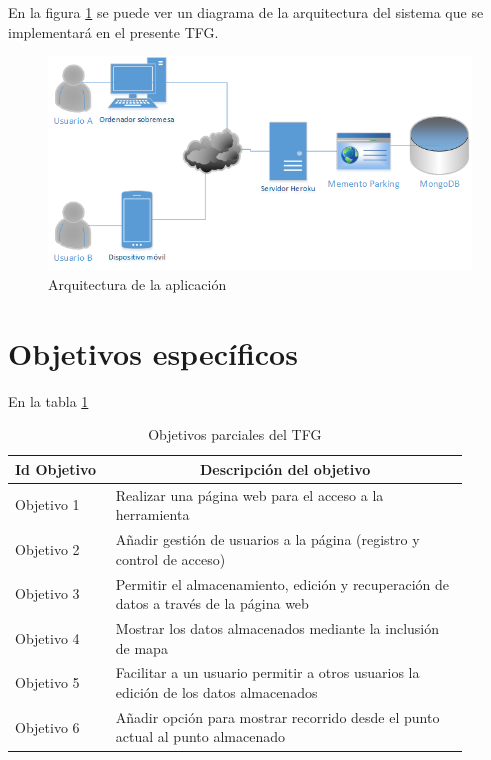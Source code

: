 
En la figura \ref{fig:arquitectura} se puede ver un diagrama de la arquitectura del sistema que se implementará en el presente TFG.
\begin{figure}[hbtp]
\centering
\includegraphics[scale=0.75, fbox={\fboxrule} 4mm]{images/objetivos/arquitectura.png}
\caption{Arquitectura de la aplicación}
\label{fig:arquitectura}
\end{figure}


\section{Objetivos específicos}

En la tabla \ref{tab:objetivos}

\begin{table}[hp]
  \centering 
  \begin{tabular}{p{0.2\linewidth}p{0.7\linewidth}}
    \multicolumn{1}{l}{\cellcolor{black!30}\textbf{Id Objetivo}} & 
 	\multicolumn{1}{c}{\cellcolor{black!30}\textbf{Descripción del objetivo}}\\
    \toprule
    Objetivo 1 & Realizar una página web para el acceso a la herramienta \\
	Objetivo 2 & Añadir gestión de usuarios a la página (registro y control de acceso) \\
	Objetivo 3 & Permitir el almacenamiento, edición y recuperación de datos a través de la página web \\
	Objetivo 4 & Mostrar los datos almacenados mediante la inclusión de mapa \\
	Objetivo 5 & Facilitar a un usuario permitir a otros usuarios la edición de los datos almacenados \\
	Objetivo 6 & Añadir opción para mostrar recorrido desde el punto actual al punto almacenado \\
    \hline
  \end{tabular}
  \caption{Objetivos parciales del TFG}
  \label{tab:objetivos}
\end{table}


